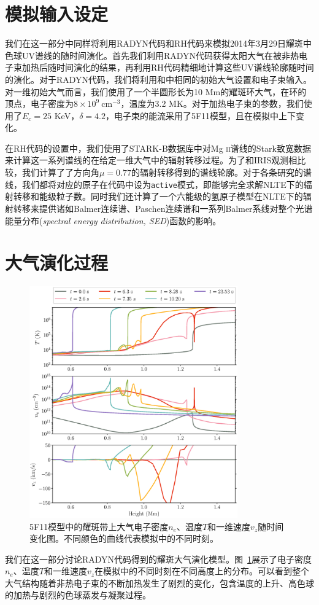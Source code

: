 \section{模拟输入设定}
我们在这一部分中同样将利用RADYN代码和RH代码来模拟2014年3月29日耀斑中色球UV谱线的随时间演化。首先我们利用RADYN代码获得太阳大气在被非热电子束加热后随时间演化的结果，再利用RH代码精细地计算这些UV谱线轮廓随时间的演化。对于RADYN代码，我们将利用和\textcites{Kowalski2017a}中相同的初始大气设置和电子束输入。对一维初始大气而言，我们使用了一个半圆形长为10 Mm的耀斑环大气，在环的顶点，电子密度为$8\times10^9\ \mathrm{cm^{-3}}$，温度为3.2 MK。对于加热电子束的参数，我们使用了$E_c=25$ KeV，$\delta = 4.2$，电子束的能流采用了5F11模型，且在模拟中上下变化。

在RH代码的设置中，我们使用了STARK-B数据库中对Mg \textsc{ii}谱线的Stark致宽数据来计算这一系列谱线的在给定一维大气中的辐射转移过程。为了和IRIS观测相比较，我们计算了了方向角$\mu = 0.77$的辐射转移得到的谱线轮廓。对于各条研究的谱线，我们都将对应的原子在代码中设为\texttt{active}模式，即能够完全求解NLTE下的辐射转移和能级粒子数。同时我们还计算了一个六能级的氢原子模型在NLTE下的辐射转移来提供诸如Balmer连续谱、Paschen连续谱和一系列Balmer系线对整个光谱能量分布(\textit{spectral energy distribution, SED})函数的影响。
\section{大气演化过程}
\begin{figure}
	\centering
	\includegraphics[width=0.8\textwidth]{figs/5F11_atmos_rev}
	\caption{5F11模型中的耀斑带上大气电子密度$n_e$、温度$T$和一维速度$v_z$随时间变化图。不同颜色的曲线代表模拟中的不同时刻。}
	\label{fig:3.1}
\end{figure}
我们在这一部分讨论RADYN代码得到的耀斑大气演化模型。图~\ref{fig:3.1}展示了电子密度$n_e$、温度$T$和一维速度$v_z$在模拟中的不同时刻在不同高度上的分布。可以看到整个大气结构随着非热电子束的不断加热发生了剧烈的变化，包含温度的上升、高色球的加热与剧烈的色球蒸发与凝聚过程。

